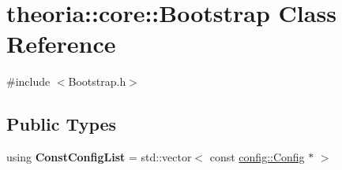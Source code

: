 \hypertarget{classtheoria_1_1core_1_1Bootstrap}{}\section{theoria\+:\+:core\+:\+:Bootstrap Class Reference}
\label{classtheoria_1_1core_1_1Bootstrap}


{\ttfamily \#include $<$Bootstrap.\+h$>$}

\subsection*{Public Types}
\begin{DoxyCompactItemize}
\item 
\mbox{\label{classtheoria_1_1core_1_1Bootstrap_a85815bda61be9829fbd359bcf572b1b8}} 
using {\bfseries Const\+Config\+List} = std\+::vector$<$ const \hyperlink{classtheoria_1_1config_1_1Config}{config\+::\+Config} $\ast$ $>$
\end{DoxyCompactItemize}
